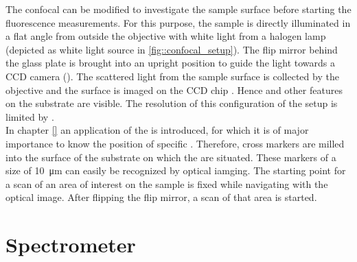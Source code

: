 		The confocal can be modified to investigate the sample surface before starting the fluorescence measurements.
		For this purpose, the sample is directly illuminated in a flat angle from outside the objective with white light from a halogen lamp (depicted as white light source in \autoref{fig::confocal_setup}).
		The flip mirror behind the glass plate is brought into an upright position to guide the light towards a CCD camera ().
		The scattered light from the sample surface is collected by the objective and the surface is imaged on the CCD chip .
		Hence \Nds and other features on the substrate are visible.
		The resolution of this configuration of the setup is limited by .
		\\
		In chapter \autoref{} an application of the \nd is introduced, for which it is of major importance to know the position of specific \nds.
		Therefore, cross markers are milled into the surface of the substrate on which the \nds are situated.
		These markers of a size of \SI{10}{\micro\meter} can easily be recognized by optical iamging.
		The starting point for a scan of an area of interest on the sample is fixed while navigating with the optical image.
		After flipping the flip mirror, a \pl scan of that area is started.

	\section[Spectrometer]{Spectrometer} \label{sec::methods_spectrometer}

